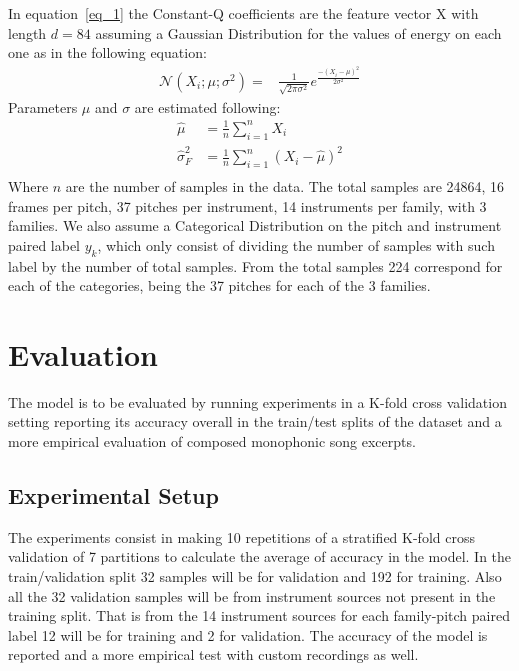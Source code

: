 \documentclass{article}
\begin{document}
In equation~\ref{eq_1} the Constant-Q coefficients are the feature vector X with length $d=84$
 assuming a Gaussian Distribution for the values of energy on each one as in the following equation:
 \begin{equation}\label{eq_2}
 \begin{split}
 \mathcal{N}(X_i;\mu;\sigma^2) =& \frac{1}{\sqrt{2\pi\sigma^2}}e^{\frac{-(X_i - \mu)^2}{2\sigma^2}}
 \end{split}
 \end{equation}
 Parameters $\mu$ and $\sigma$ are estimated following:
 \begin{equation}\label{eq_3}
 \begin{split}
 \hat{\mu}&=\frac{1}{n}\sum_{i=1}^{n}{X_i}\\
 \hat{\sigma}^2_F&=\frac{1}{n}\sum_{i=1}^{n}{(X_i - \hat{\mu})^2}\\
 \end{split}
 \end{equation}
 Where $n$ are the number of samples in the data. The total samples are 24864, 16 frames per pitch, 37 pitches per instrument, 14 instruments per family, with 3 families. We also assume a Categorical Distribution on the pitch and instrument paired label $y_k$, which only consist of dividing the number of samples with such label by the number of total samples. From the total samples 224 correspond for each of the categories, being the 37 pitches for each of the 3 families.

\section{Evaluation}\label{sec:evaluation}
The model is to be evaluated by running experiments in a K-fold cross validation setting reporting its accuracy overall in the train/test splits of the dataset and a more empirical evaluation of composed monophonic song excerpts. 
\subsection{Experimental Setup}
The experiments consist in making 10 repetitions of a stratified K-fold cross validation of 7 partitions to calculate the average of accuracy in the model. In the train/validation split 32 samples will be for validation and 192 for training. Also all the 32 validation samples will be from instrument sources not present in the training split. That is from the 14 instrument sources for each family-pitch paired label 12 will be for training and 2 for validation. The accuracy of the model is reported and a more empirical test with custom recordings as well.
\end{document}
